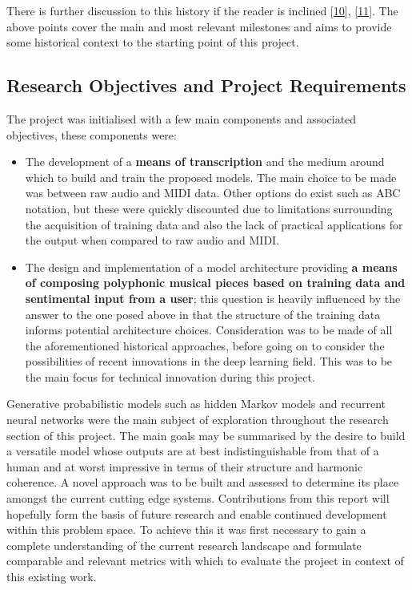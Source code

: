 \documentclass[12pt,]{article}
\providecommand{\tightlist}{%
  \setlength{\itemsep}{0pt}\setlength{\parskip}{0pt}}
\begin{document}
There is further discussion to this history if the reader is inclined
{[}\protect\hyperlink{ref-mediumkylemcdonald}{10}{]},
{[}\protect\hyperlink{ref-libdlmusic}{11}{]}. The above points cover the
main and most relevant milestones and aims to provide some historical
context to the starting point of this project.

\hypertarget{research-objectives-and-project-requirements}{%
\subsection{Research Objectives and Project
Requirements}\label{research-objectives-and-project-requirements}}

The project was initialised with a few main components and associated
objectives, these components were:

\begin{itemize}
\tightlist
\item
  The development of a \textbf{means of transcription} and the medium
  around which to build and train the proposed models. The main choice
  to be made was between raw audio and MIDI data. Other options do exist
  such as ABC notation, but these were quickly discounted due to
  limitations surrounding the acquisition of training data and also the
  lack of practical applications for the output when compared to raw
  audio and MIDI.
\item
  The design and implementation of a model architecture providing
  \textbf{a means of composing polyphonic musical pieces based on
  training data and sentimental input from a user}; this question is
  heavily influenced by the answer to the one posed above in that the
  structure of the training data informs potential architecture choices.
  Consideration was to be made of all the aforementioned historical
  approaches, before going on to consider the possibilities of recent
  innovations in the deep learning field. This was to be the main focus
  for technical innovation during this project.
\end{itemize}

Generative probabilistic models such as hidden Markov models and
recurrent neural networks were the main subject of exploration
throughout the research section of this project. The main goals may be
summarised by the desire to build a versatile model whose outputs are at
best indistinguishable from that of a human and at worst impressive in
terms of their structure and harmonic coherence. A novel approach was to
be built and assessed to determine its place amongst the current cutting
edge systems. Contributions from this report will hopefully form the
basis of future research and enable continued development within this
problem space. To achieve this it was first necessary to gain a complete
understanding of the current research landscape and formulate comparable
and relevant metrics with which to evaluate the project in context of
this existing work.
\end{document}
